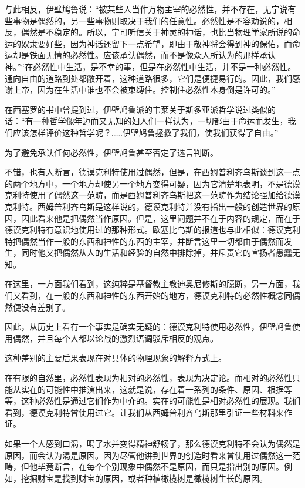 \documentclass[a4paper,twoside,12pt]{ctexart}
\begin{document}
与此相反，伊壁鸠鲁说：“被某些人当作万物主宰的必然性，并不存在，无宁说有些事物是偶然的，另一些事物则取决于我们的任意性。必然性是不容劝说的，相反，偶然是不稳定的。所以，宁可听信关于神灵的神话，也比当物理学家所说的命运的奴隶要好些，因为神话还留下一点希望，即由于敬神将会得到神的保佑，而命运却是铁面无情的必然性。应该承认偶然，而不是像众人所认为的那样承认神。”“在必然性中生活，是不幸的事，但是在必然性中生活，并不是一种必然性。通向自由的道路到处都敞开着，这种道路很多，它们是便捷易行的。因此，我们感谢上帝，因为在生活中谁也不会被束缚住。控制住必然性本身倒是许可的。”

在西塞罗的书中曾提到过，伊壁鸠鲁派的韦莱关于斯多亚派哲学说过类似的话：“有一种哲学像年迈而又无知的妇人们一样认为，一切都由于命运而发生，我们应该怎样评价这种哲学呢？……伊壁鸠鲁拯救了我们，使我们获得了自由。”

为了避免承认任何必然性，伊壁鸠鲁甚至否定了选言判断。

不错，也有人断言，德谟克利特使用过偶然，但是，在西姆普利齐乌斯谈到这一点的两个地方中，一个地方却使另一个地方变得可疑，因为它清楚地表明，不是德谟克利特使用了偶然这一范畴，而是西姆普利齐乌斯把这一范畴作为结论强加给德谟克利特。西姆普利齐乌斯是这样说的，德谟克利特并没有指出一般的创造世界的原因，因此看来他是把偶然当作原因。但是，这里问题并不在于内容的规定，而在于德谟克利特有意识地使用过的那种形式。欧塞比乌斯的报道也与此相似：德谟克利特把偶然当作一般的东西和神性的东西的主宰，并断言这里一切都由于偶然而发生，同时他又把偶然从人的生活和经验的自然中排除掉，并斥责它的宣扬者愚蠢无知。

在这里，一方面我们看到，这纯粹是基督教主教迪奥尼修斯的臆断，另一方面，我们又看到，在一般的东西和神性的东西开始的地方，德谟克利特的必然性概念同偶然便没有差别了。

因此，从历史上看有一个事实是确实无疑的：德谟克利特使用必然性，伊壁鸠鲁使用偶然，并且每个人都以论战的激烈语调驳斥相反的观点。

这种差别的主要后果表现在对具体的物理现象的解释方式上。

在有限的自然里，必然性表现为相对的必然性，表现为决定论。而相对的必然性只能从实在的可能性中推演出来，这就是说，存在着一系列的条件、原因、根据等等，这种必然性是通过它们作为中介的。实在的可能性是相对必然性的展现。我们看到，德谟克利特曾使用过它。让我们从西姆普利齐乌斯那里引证一些材料来作证。

如果一个人感到口渴，喝了水并变得精神舒畅了，那么德谟克利特不会认为偶然是原因，而会认为渴是原因。因为尽管他讲到世界的创造时看来曾使用过偶然这一范畴，但他毕竟断言，在每个个别现象中偶然不是原因，而只是指出别的原因。例如，挖掘财宝是找到财宝的原因，或者种植橄榄树是橄榄树生长的原因。
\end{document}

